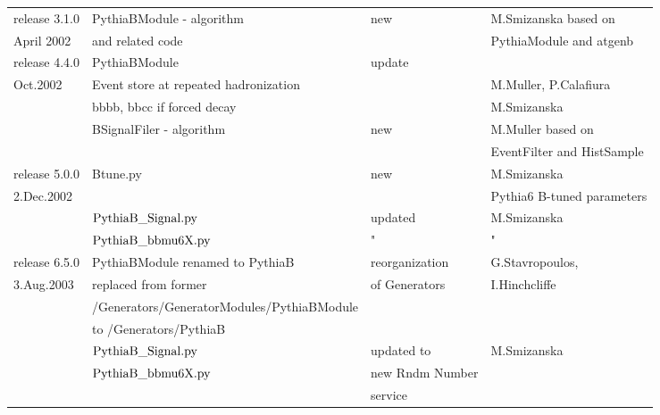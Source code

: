 \begin{scriptsize}
\begin{tabular}{|l|l|l|l|}
\hline

release 3.1.0  & PythiaBModule - algorithm & new  & M.Smizanska based on  \\
  April 2002   &    and related code       &      & PythiaModule and atgenb \\ \hline
release 4.4.0  & PythiaBModule             & update    &  \\
 Oct.2002      & Event store at repeated hadronization  & &  M.Muller,  P.Calafiura      \\
               & bbbb, bbcc if forced decay& & M.Smizanska \\ \cline{2-4}

               & BSignalFiler - algorithm & new &   M.Muller based on \\
           &                          &  &EventFilter and HistSample \\
\hline
release 5.0.0  & Btune.py & new    &  M.Smizanska \\
 2.Dec.2002              &           &          & Pythia6 B-tuned parameters \\ \cline{2-4}
               &  $\rm PythiaB\_Signal.py$    & updated & M.Smizanska\\
               &  $\rm PythiaB\_bbmu6X.py$     &     "  &  " \\ \hline
 release 6.5.0 & PythiaBModule renamed to PythiaB                        & reorganization   & G.Stavropoulos,  \\
 3.Aug.2003    &   replaced from former & of Generators  &I.Hinchcliffe\\
               & /Generators/GeneratorModules/PythiaBModule & &\\
               & to /Generators/PythiaB  & &\\ \cline{2-4}
               &  $\rm PythiaB\_Signal.py$    & updated to  & M.Smizanska\\
               &   $\rm PythiaB\_bbmu6X.py$ &  new  Rndm Number     &  \\ 
               &    &    service      &   \\ \hline
\end{tabular}

\end{scriptsize}
\tableofcontents
\newpage

